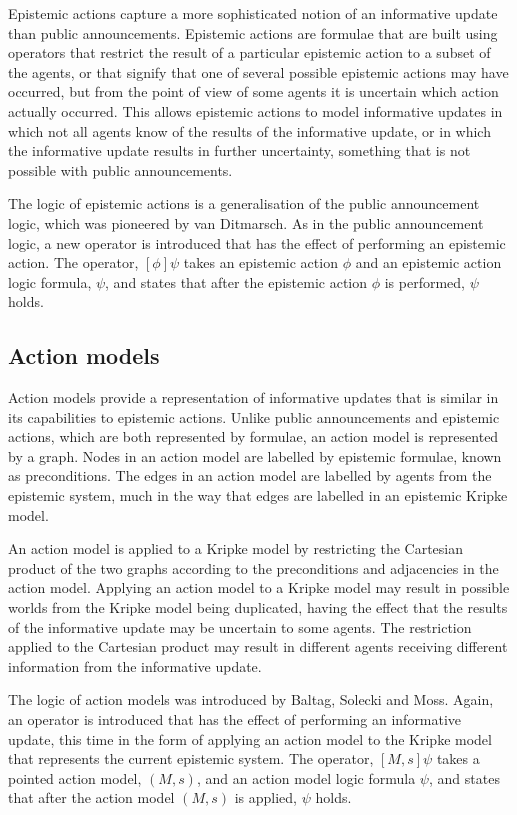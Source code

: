 Epistemic actions capture a more sophisticated notion of an informative update
than public announcements. Epistemic actions are formulae that are built using
operators that restrict the result of a particular epistemic action to a subset
of the agents, or that signify that one of several possible epistemic actions
may have occurred, but from the point of view of some agents it is uncertain
which action actually occurred. This allows epistemic actions to model
informative updates in which not all agents know of the results of the
informative update, or in which the informative update results in further
uncertainty, something that is not possible with public announcements.

The logic of epistemic actions is a generalisation of the public announcement
logic, which was pioneered by van
Ditmarsch\cite{vanditmarsch1999logic}\cite{vanditmarsch2001knowledge}\cite{vanditmarsch2007dynamic}.
As in the public announcement logic, a new operator is introduced that has the
effect of performing an epistemic action.  The operator, $[\phi]\psi$ takes an
epistemic action $\phi$ and an epistemic action logic formula, $\psi$, and
states that after the epistemic action $\phi$ is performed, $\psi$ holds.

\subsection*{Action models}

Action models provide a representation of informative updates that is similar
in its capabilities to epistemic actions. Unlike public announcements and
epistemic actions, which are both represented by formulae, an action model is
represented by a graph. Nodes in an action model are labelled by epistemic
formulae, known as preconditions. The edges in an action model are labelled by
agents from the epistemic system, much in the way that edges are labelled in an
epistemic Kripke model.

An action model is applied to a Kripke model by restricting the Cartesian
product of the two graphs according to the preconditions and adjacencies in the
action model.  Applying an action model to a Kripke model may result in possible
worlds from the Kripke model being duplicated, having the effect that the
results of the informative update may be uncertain to some agents. The
restriction applied to the Cartesian product may result in different agents
receiving different information from the informative update.

The logic of action models was introduced by Baltag, Solecki and
Moss\cite{baltag2004logics}. Again, an operator is introduced that has the
effect of performing an informative update, this time in the form of applying an
action model to the Kripke model that represents the current epistemic system.
The operator, $[M,s]\psi$ takes a pointed action model, $(M, s)$, and an action
model logic formula $\psi$, and states that after the action model $(M, s)$ is
applied, $\psi$ holds.

